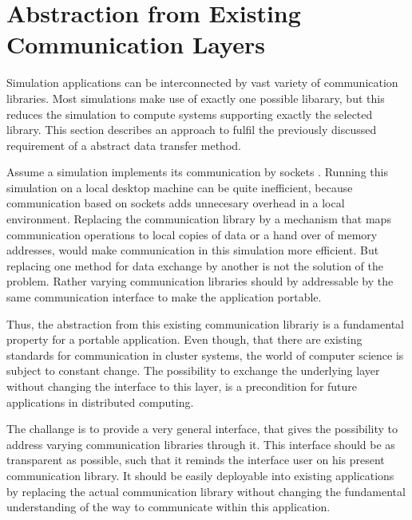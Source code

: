 \section{Abstraction from Existing Communication Layers}
\label{sec:comm_abstraction}

Simulation applications can be interconnected by vast variety of
communication libraries. Most simulations make use of exactly one
possible libarary, but this reduces the simulation to compute systems
supporting exactly the selected library. This section describes an
approach to fulfil the previously discussed requirement of
a abstract data transfer method.


Assume a simulation  implements its communication by sockets
. Running this simulation on a local desktop machine can be quite
inefficient, because communication based on sockets adds unnecesary
overhead in a local environment. Replacing the communication library
by a mechanism that maps communication operations to local copies of
data or a hand over of memory addresses, would make communication in
this simulation more efficient. But replacing one method for data
exchange by another is not the solution of the problem. Rather
varying communication libraries should by addressable by the same
communication interface to make the application portable.

Thus, the abstraction from
this existing communication librariy is a fundamental property for a
portable application.  Even though, that there are existing standards
for communication in cluster systems, the world of computer science is
subject to constant change. The possibility to exchange the underlying
layer without changing the interface to this layer, is a precondition
for future applications in distributed computing.

The challange is to provide a very general interface, that gives the
possibility to address varying communication libraries through it.
This interface should be as transparent as possible, such that it
reminds the interface user on his present communication library.  It
should be easily deployable into existing applications by replacing
the actual communication library without changing the fundamental
understanding of the way to communicate within this application.


